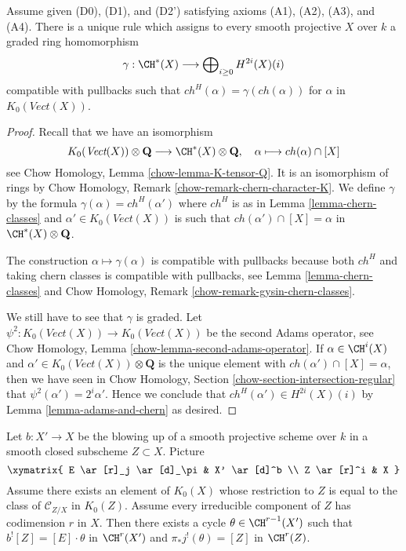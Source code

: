 \begin{lemma}
\label{lemma-cycle-classes}
Assume given (D0), (D1), and (D2') satisfying axioms (A1), (A2), (A3), and (A4).
There is a unique rule which assigns to every smooth projective $X$ over $k$
a graded ring homomorphism
$$
\gamma : \CH^*(X) \longrightarrow \bigoplus\nolimits_{i \geq 0} H^{2i}(X)(i)
$$
compatible with pullbacks such that $ch^H(\alpha) = \gamma(ch(\alpha))$
for $\alpha$ in $K_0(\textit{Vect}(X))$.
\end{lemma}

\begin{proof}
Recall that we have an isomorphism
$$
K_0(\textit{Vect}(X)) \otimes \mathbf{Q}
\longrightarrow \CH^*(X) \otimes \mathbf{Q},\quad
\alpha \longmapsto ch(\alpha) \cap [X]
$$
see Chow Homology, Lemma \ref{chow-lemma-K-tensor-Q}. It is an isomorphism
of rings by Chow Homology, Remark \ref{chow-remark-chern-character-K}.
We define $\gamma$ by the formula $\gamma(\alpha) = ch^H(\alpha')$
where $ch^H$ is as in Lemma \ref{lemma-chern-classes} and
$\alpha' \in K_0(\textit{Vect}(X))$ is such that
$ch(\alpha') \cap [X] = \alpha$ in $\CH^*(X) \otimes \mathbf{Q}$.

\medskip\noindent
The construction $\alpha \mapsto \gamma(\alpha)$ is compatible
with pullbacks because both $ch^H$ and taking chern classes
is compatible with pullbacks, see
Lemma \ref{lemma-chern-classes} and
Chow Homology, Remark \ref{chow-remark-gysin-chern-classes}.

\medskip\noindent
We still have to see that $\gamma$ is graded.
Let $\psi^2 : K_0(\textit{Vect}(X)) \to K_0(\textit{Vect}(X))$
be the second Adams operator, see Chow Homology,
Lemma \ref{chow-lemma-second-adams-operator}.
If $\alpha \in \CH^i(X)$ and
$\alpha' \in K_0(\textit{Vect}(X)) \otimes \mathbf{Q}$
is the unique element with $ch(\alpha') \cap [X] = \alpha$,
then we have seen in
Chow Homology, Section \ref{chow-section-intersection-regular}
that $\psi^2(\alpha') = 2^i \alpha'$.
Hence we conclude that $ch^H(\alpha') \in H^{2i}(X)(i)$
by Lemma \ref{lemma-adams-and-chern} as desired.
\end{proof}

\begin{lemma}
\label{lemma-divide-pullback-good-blowing-up}
Let $b : X' \to X$ be the blowing up of a smooth projective
scheme over $k$ in a smooth closed subscheme $Z \subset X$.
Picture
$$
\xymatrix{
E \ar[r]_j \ar[d]_\pi & X' \ar[d]^b \\
Z \ar[r]^i & X
}
$$
Assume there exists an element of $K_0(X)$ whose restriction to
$Z$ is equal to the class of $\mathcal{C}_{Z/X}$ in $K_0(Z)$.
Assume every irreducible component of $Z$ has codimension $r$ in $X$.
Then there exists a cycle $\theta \in \CH^{r - 1}(X')$
such that $b^![Z] = [E] \cdot \theta$ in $\CH^r(X')$ and
$\pi_*j^!(\theta) = [Z]$ in $\CH^r(Z)$.
\end{lemma}

